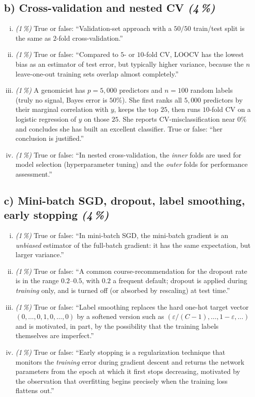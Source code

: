 \documentclass[11pt,a4paper]{article}
\newcommand{\subpoints}[1]{\textit{(#1\,\%)}}
\begin{document}
\subsection*{b) Cross-validation and nested CV \subpoints{4}}
\begin{enumerate}[(i)]
  \item \subpoints{1} True or false: ``Validation-set approach with a $50/50$ train/test split is the same as $2$-fold cross-validation.''
  \item \subpoints{1} True or false: ``Compared to $5$- or $10$-fold CV, LOOCV has the lowest bias as an estimator of test error, but typically higher variance, because the $n$ leave-one-out training sets overlap almost completely.''
  \item \subpoints{1} A genomicist has $p = 5{,}000$ predictors and $n = 100$ random labels (truly no signal, Bayes error is $50\%$). She first ranks all $5{,}000$ predictors by their marginal correlation with $y$, keeps the top $25$, then runs $10$-fold CV on a logistic regression of $y$ on those $25$. She reports CV-misclassification near $0\%$ and concludes she has built an excellent classifier. True or false: ``her conclusion is justified.''
  \item \subpoints{1} True or false: ``In nested cross-validation, the \emph{inner} folds are used for model selection (hyperparameter tuning) and the \emph{outer} folds for performance assessment.''
\end{enumerate}

\subsection*{c) Mini-batch SGD, dropout, label smoothing, early stopping \subpoints{4}}
\begin{enumerate}[(i)]
  \item \subpoints{1} True or false: ``In mini-batch SGD, the mini-batch gradient is an \emph{unbiased} estimator of the full-batch gradient: it has the same expectation, but larger variance.''
  \item \subpoints{1} True or false: ``A common course-recommendation for the dropout rate is in the range $0.2$--$0.5$, with $0.2$ a frequent default; dropout is applied during \emph{training} only, and is turned off (or absorbed by rescaling) at test time.''
  \item \subpoints{1} True or false: ``Label smoothing replaces the hard one-hot target vector $(0,\dots,0,1,0,\dots,0)$ by a softened version such as $(\varepsilon/(C-1),\dots,1-\varepsilon,\dots)$ and is motivated, in part, by the possibility that the training labels themselves are imperfect.''
  \item \subpoints{1} True or false: ``Early stopping is a regularization technique that monitors the \emph{training} error during gradient descent and returns the network parameters from the epoch at which it first stops decreasing, motivated by the observation that overfitting begins precisely when the training loss flattens out.''
\end{enumerate}
\end{document}

